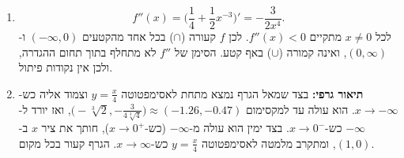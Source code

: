 \begin{solution}
\begin{enumerate}
  \item
  \[ f''(x)=\Big(\frac14+\frac12x^{-3}\Big)'=-\frac{3}{2x^4}. \]
  לכל $x\neq 0$ מתקיים $f''(x)<0$. לכן $f$ קעורה ($\cap$) בכל אחד מהקטעים $(-\infty,0)$ ו-$(0,\infty)$, ואינה קמורה ($\cup$) באף קטע. הסימן של $f''$ לא מתחלף בתוך תחום ההגדרה, ולכן אין נקודות פיתול.

  \item \textbf{תיאור גרפי:} בצד שמאל הגרף נמצא מתחת לאסימפטוטה $y=\frac{x}{4}$ וצמוד אליה כש-$x\to-\infty$. הוא עולה עד למקסימום $\big(-\sqrt[3]{2},-\frac{3}{4\sqrt[3]{4}}\big)\approx(-1.26,-0.47)$, ואז יורד ל-$-\infty$ כש-$x\to0^-$. בצד ימין הוא עולה מ-$-\infty$ (כש-$x\to0^+$), חותך את ציר $x$ ב-$(1,0)$, ומתקרב מלמטה לאסימפטוטה $y=\frac{x}{4}$ כש-$x\to\infty$. הגרף קעור בכל מקום.
\end{enumerate}
\end{solution}

